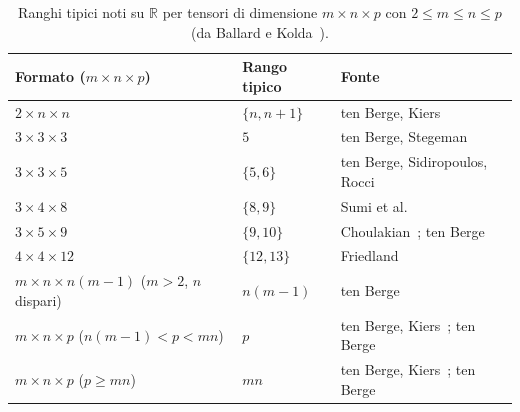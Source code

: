 \begin{table}[htbp]
	\centering
	\small
	\caption{Ranghi tipici noti su $\mathbb{R}$ per tensori di dimensione $m \times n \times p$ con $2 \le m \le n \le p$ (da Ballard e Kolda~\cite[Tabella~16.2]{BK25}).}
	\label{tab:typical_ranks}
	\begin{tabular}{lll}
		\toprule
		Formato ($m \times n \times p$)                   & Rango tipico & Fonte                                                                \\
		\midrule
		$2 \times n \times n$                             & $\{n, n+1\}$ & ten Berge, Kiers~\cite{tenberge1999}                                 \\
		$3 \times 3 \times 3$                             & $5$          & ten Berge, Stegeman~\cite{tenberge2006}                              \\
		$3 \times 3 \times 5$                             & $\{5, 6\}$   & ten Berge, Sidiropoulos, Rocci~\cite{tenberge2004}                   \\
		$3 \times 4 \times 8$                             & $\{8, 9\}$   & Sumi et al.~\cite{sumi2013}                                          \\
		$3 \times 5 \times 9$                             & $\{9, 10\}$  & Choulakian~\cite{choulakian2010}; ten Berge~\cite{tenberge2011}      \\
		$4 \times 4 \times 12$                            & $\{12, 13\}$ & Friedland~\cite{friedland2012}                                       \\
		$m \times n \times n(m-1)$ ($m > 2$, $n$ dispari) & $n(m-1)$     & ten Berge~\cite{tenberge2000b}                                       \\
		$m \times n \times p$ ($n(m-1) < p < mn$)         & $p$          & ten Berge, Kiers~\cite{tenberge1999}; ten Berge~\cite{tenberge2000b} \\
		$m \times n \times p$ ($p \ge mn$)                & $mn$         & ten Berge, Kiers~\cite{tenberge1999}; ten
		Berge~\cite{tenberge2000b}                                                                                                              \\
		\bottomrule
	\end{tabular}
\end{table}


